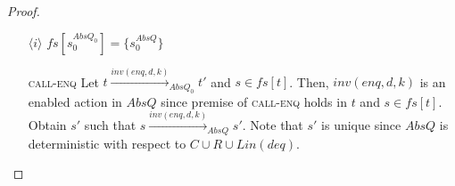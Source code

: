 \begin{proof}

\begin{itemize}
\item[$\langle i \rangle$] $fs[s_0^{AbsQ_0}] = \{s_0^{AbsQ}\}$
\item[\textsc{call-enq}] Let $t \xrightarrow{inv(enq,d,k)}_{AbsQ_0} t'$ and $s \in fs[t]$. Then, $inv(enq,d,k)$ is an enabled action in $AbsQ$ since premise of \textsc{call-enq} holds in $t$ and $s \in fs[t]$. Obtain $s'$ such that $s \xrightarrow{inv(enq,d,k)}_{AbsQ} s'$. Note that $s'$ is unique since $AbsQ$ is deterministic with respect to $C \cup R \cup Lin(deq)$. 


\end{itemize}
\end{proof}
